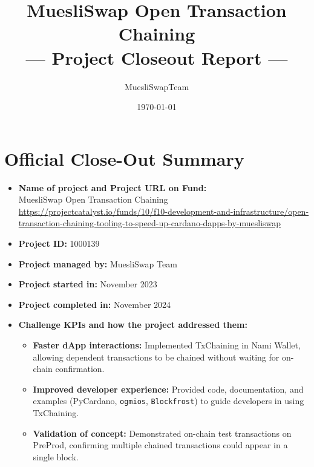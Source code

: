\documentclass[11pt]{article}
\title{MuesliSwap Open Transaction Chaining \\--- Project Closeout Report ---}
\author{MuesliSwapTeam}
\date{\today}
\begin{document}
\maketitle


\section*{Official Close-Out Summary}
\begin{itemize}
    \item \textbf{Name of project and Project URL on Fund:}\\
    MuesliSwap Open Transaction Chaining \\
    \url{https://projectcatalyst.io/funds/10/f10-development-and-infrastructure/open-transaction-chaining-tooling-to-speed-up-cardano-dapps-by-muesliswap}

    \item \textbf{Project ID:} 1000139

    \item \textbf{Project managed by:} MuesliSwap Team

    \item \textbf{Project started in:} November 2023

    \item \textbf{Project completed in:} November 2024

    \item \textbf{Challenge KPIs and how the project addressed them:}
    \begin{itemize}
        \item \textbf{Faster dApp interactions:} Implemented TxChaining in Nami Wallet, allowing dependent transactions to be chained without waiting for on-chain confirmation.
        \item \textbf{Improved developer experience:} Provided code, documentation, and examples (PyCardano, \texttt{ogmios}, \texttt{Blockfrost}) to guide developers in using TxChaining.
        \item \textbf{Validation of concept:} Demonstrated on-chain test transactions on PreProd, confirming multiple chained transactions could appear in a single block.
    \end{itemize}


\end{itemize}
\end{document}
